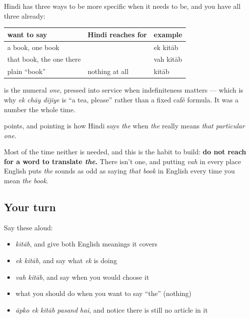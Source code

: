 \begin{grammarlens}[title={Grammar Lens: what does the work instead}]
Hindi has three ways to be more specific when it needs to be, and you have all three already:

\noindent
\begin{tabularx}{\linewidth}{@{}>{\raggedright\arraybackslash}X>{\raggedright\arraybackslash}X>{\raggedright\arraybackslash}X@{}}
\toprule
\textbf{want to say} & \textbf{Hindi reaches for} & \textbf{example} \\
\midrule
a book, one book & \textbf{\hi{एक}} & ek kitāb \\
that book, the one there & \textbf{\hi{वह}} & vah kitāb \\
plain \textquotedblleft{}book\textquotedblright{} & nothing at all & kitāb \\
\bottomrule
\end{tabularx}

\textbf{} is the numeral \emph{one}, pressed into service when indefiniteness matters — which is why \emph{ek chāy dījiye} is \textquotedblleft{}a tea, please\textquotedblright{} rather than a fixed café formula. It was a number the whole time.

\textbf{} points, and pointing is how Hindi says \emph{the} when \emph{the} really means \emph{that particular one}.

Most of the time neither is needed, and this is the habit to build: \textbf{do not reach for a word to translate \emph{the}.} There isn't one, and putting \emph{vah} in every place English puts \emph{the} sounds as odd as saying \emph{that book} in English every time you mean \emph{the book}.
\end{grammarlens}

\subsection*{Your turn}
Say these aloud:

\begin{itemize}
\raggedright
  \item \emph{kitāb}, and give both English meanings it covers
  \item \emph{ek kitāb}, and say what \emph{ek} is doing
  \item \emph{vah kitāb}, and say when you would choose it
  \item what you should do when you want to say \textquotedblleft{}the\textquotedblright{} (nothing)
  \item \emph{āpko ek kitāb pasand hai}, and notice there is still no article in it
\end{itemize}

